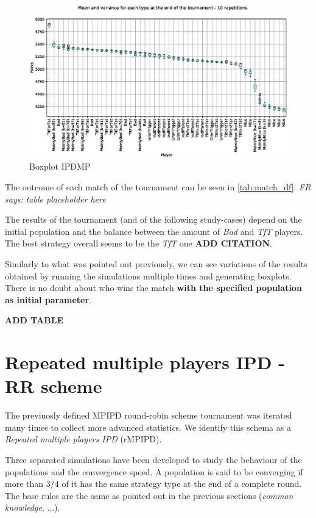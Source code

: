 \documentclass[journal,a4paper,10pt,twoside]{IEEEtran} %
\newcommand{\FR}[1]{\textit{\color{ForestGreen}FR says: #1}}
\begin{document}
\begin{figure}[!ht]
    \centering
    \includegraphics[width=1\columnwidth]{../img/ipdmp/ipdmp-boxplot-final-points-50}
    \caption{Boxplot IPDMP}
    \label{fig:boxIPDMP}
\end{figure}

The outcome of each match of the tournament can be seen in \autoref{tab:match_df}. \FR{table placeholder here}

The results of the tournament (and of the following study-cases) depend on the initial population and the balance between the amount of \textit{Bad} and \textit{TfT} players. The best strategy overall seems to be the \textit{TfT} one \textbf{ADD CITATION}.

Similarly to what was pointed out previously, we can see variations of the results obtained by running the simulations multiple times and generating boxplots. There is no doubt about who wins the match \textbf{with the specified population as initial parameter}.

\textbf{ADD TABLE}

\section{Repeated multiple players IPD - RR scheme} \label{s:rIPDMP}
The previuosly defined MPIPD round-robin scheme tournament was iterated many times to collect more advanced statistics.
We identify this schema as a \textit{Repeated multiple players IPD} (rMPIPD).

Three separated simulations have been developed to study the behaviour of the populations and the convergence speed. A population is said to be converging if more than $3/4$ of it has the same strategy type at the end of a complete round. The base rules are the same as pointed out in the previous sections (\textit{common knowledge}, ...).
\end{document}

